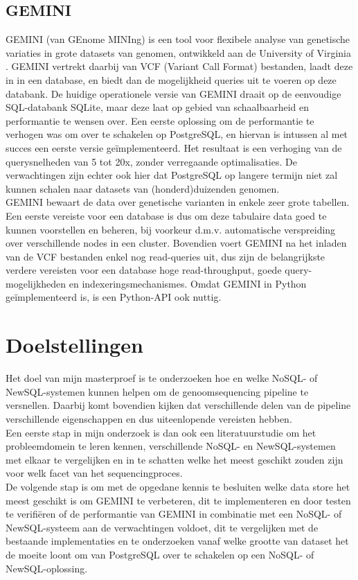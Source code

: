 \documentclass{article}
\begin{document}
\subsection{GEMINI}

GEMINI (van GEnome MINIng) is een tool voor flexibele analyse van genetische variaties in grote datasets van genomen, ontwikkeld aan de University of Virginia \cite{10.1371/journal.pcbi.1003153}. GEMINI vertrekt daarbij van VCF (Variant Call Format) bestanden, laadt deze in in een database, en biedt dan de mogelijkheid queries uit te voeren op deze databank. De huidige operationele versie van GEMINI draait op de eenvoudige SQL-databank SQLite, maar deze laat op gebied van schaalbaarheid en performantie te wensen over. Een eerste oplossing om de performantie te verhogen was om over te schakelen op PostgreSQL, en hiervan is intussen al met succes een eerste versie ge\"implementeerd. Het resultaat is een verhoging van de querysnelheden van 5 tot 20x, zonder verregaande optimalisaties. De verwachtingen zijn echter ook hier dat PostgreSQL op langere termijn niet zal kunnen schalen naar datasets van (honderd)duizenden genomen.\\
GEMINI bewaart de data over genetische varianten in enkele zeer grote tabellen. Een eerste vereiste voor een database is dus om deze tabulaire data goed te kunnen voorstellen en beheren, bij voorkeur d.m.v. automatische verspreiding over verschillende nodes in een cluster. Bovendien voert GEMINI na het inladen van de VCF bestanden enkel nog read-queries uit, dus zijn de belangrijkste verdere vereisten voor een database hoge read-throughput, goede query-mogelijkheden en indexeringsmechanismes. Omdat GEMINI in Python ge\"implementeerd is, is een Python-API ook nuttig. 

\section{Doelstellingen}

Het doel van mijn masterproef is te onderzoeken hoe en welke NoSQL- of NewSQL-systemen kunnen helpen om de genoomsequencing pipeline te versnellen. Daarbij komt bovendien kijken dat verschillende delen van de pipeline verschillende eigenschappen en dus uiteenlopende vereisten hebben.\\
Een eerste stap in mijn onderzoek is dan ook een literatuurstudie om het probleemdomein te leren kennen, verschillende NoSQL- en NewSQL-systemen met elkaar te vergelijken en in te schatten welke het meest geschikt zouden zijn voor welk facet van het sequencingproces.\\
De volgende stap is om met de opgedane kennis te besluiten welke data store het meest geschikt is om GEMINI te verbeteren, dit te implementeren en door testen te verifiëren of de performantie van GEMINI in combinatie met een NoSQL- of NewSQL-systeem aan de verwachtingen voldoet, dit te vergelijken met de bestaande implementaties en te onderzoeken vanaf welke grootte van dataset het de moeite loont om van PostgreSQL over te schakelen op een NoSQL- of NewSQL-oplossing.
\end{document}
